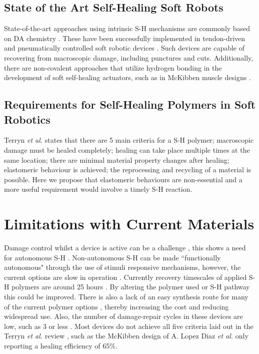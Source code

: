 \subsection{State of the Art Self-Healing Soft Robots}
 State-of-the-art approaches using intrinsic S-H mechanisms are commonly based on DA chemistry \cite{terryn2021review}. These have been successfully implemented in tendon-driven \cite{roels2019multi} and pneumatically controlled soft robotic devices \cite{terryn2020room, terryn2017pneumatic}. Such devices are capable of recovering from macroscopic damage, including punctures and cuts. Additionally, there are non-covalent approaches that utilize hydrogen bonding in the development of soft self-healing actuators, such as in McKibben muscle designs \cite{lopez2020autonomous}.

\subsection{Requirements for Self-Healing Polymers in Soft Robotics}
Terryn \textit{et al.} \cite{terryn2021review} states that there are 5 main criteria for a S-H polymer; macroscopic damage must be healed completely; healing can take place multiple times at the same location; there are minimal material property changes after healing; elastomeric behaviour is achieved; the reprocessing and recycling of a material is possible. Here we propose that elastomeric behaviours are non-essential and a more useful requirement would involve a timely S-H reaction.  


\section{Limitations with Current Materials}

Damage control whilst a device is active can be a challenge \cite{kashef2025toward}, this shows a need for autonomous S-H \cite{terryn2021review}. Non-autonomous S-H can be made ``functionally autonomous" through the use of stimuli responsive mechanisms, however, the current options are slow in operation \cite{kashef2025toward}. Currently recovery timescales of applied S-H polymers are around 25 hours \cite{terryn2017pneumatic, bilodeau2017self}. By altering the polymer used or S-H pathway this could be improved. There is also a lack of an easy synthesis route for many of the current polymer options \cite{bilodeau2017self}, thereby increasing the cost and reducing widespread use. Also, the number of damage-repair cycles in these devices are low, such as 3 or less \cite{terryn2017pneumatic}. Most devices do not achieve all five criteria laid out in the Terryn \textit{et al.} review \cite{terryn2021review}, such as the McKibben design of A. Lopez Diaz \textit{et al.} \cite{lopez2020autonomous} only reporting a healing efficiency of 65\%.
